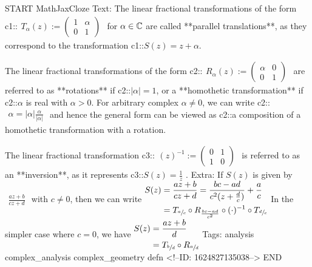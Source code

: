 \documentclass{memoir}
\begin{document}
\begin{anki}
START
MathJaxCloze
Text: The linear fractional transformations of the form
 {{c1::\(\begin{align*}
         	T_\alpha (z) := \begin{pmatrix} 1 & \alpha \\ 0 & 1 \end{pmatrix} 
         \end{align*}\)}} 
for \(\alpha  \in \mathbb{C}\) are called **parallel translations**, as they correspond to the transformation {{c1::\(S(z) = z + \alpha \)}}.

The linear fractional transformations of the form
 {{c2::\(\begin{align*}
         	R_\alpha (z) := \begin{pmatrix} \alpha  & 0 \\ 0 & 1 \end{pmatrix} 
         \end{align*}\)}}
are referred to as **rotations** if {{c2::\(\left| \alpha  \right| = 1\)}}, or a **homothetic transformation** if {{c2::\(\alpha \) is real with \(\alpha >0\)}}. For arbitrary complex \(\alpha \neq 0\), we can write
 {{c2::\(\begin{align*}
        	\alpha  = \left| \alpha  \right| \frac{\alpha }{\left| \alpha  \right| }
        \end{align*}\)}} 
and hence the general form can be viewed as {{c2::a composition of a homothetic transformation with a rotation}}.

The linear fractional transformation
 {{c3::\(\begin{align*}
        (z)^{-1} := \begin{pmatrix} 0 & 1 \\ 1 & 0 \end{pmatrix} 
        \end{align*}\)}} 
is referred to as an **inversion**, as it represents {{c3::\(S(z) = \frac{1}{z}\)}} .
Extra: If \(S(z)\) is given by
\(\begin{align*}
  	\frac{az+b}{cz+d}
  \end{align*}\)
with \(c\neq 0\), then we can write
\(\begin{align*}
  	S(z) &= \frac{az+b}{c z+d} = \frac{bc-ad}{c^2(z+\frac{d}{c})}+ \frac{a}{c}\\
  	&=  T_{\sfrac{a}{c}}\circ R_{\frac{bc-ad}{c^2}}\circ (\cdot)^{-1} \circ T_{\sfrac{d}{c}}
  \end{align*}\)
In the simpler case where \(c=0\), we have
\(\begin{align*}
  	S(z) &= \frac{az+b}{d}\\
  	&= T_{\sfrac{b}{d}}\circ R_{\sfrac{a}{d}}
  \end{align*}\)
Tags: analysis complex_analysis complex_geometry defn
<!--ID: 1624827135038-->
END
\end{anki}
\end{document}
